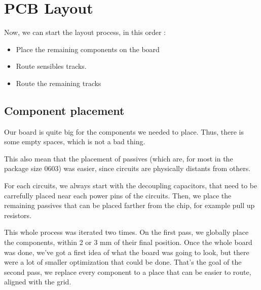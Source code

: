 \section{PCB Layout}
Now, we can start the layout process, in this order :

\begin{itemize}[noitemsep]
    \item   Place the remaining components on the board
    \item   Route sensibles tracks.
    \item   Route the remaining tracks
\end{itemize}

\subsection{Component placement}
Our board is quite big for the components we needed to place. Thus, there is some empty spaces,
which is not a bad thing.

This also mean that the placement of passives (which are, for most in the package size 0603) was
easier, since circuits are physically distants from others.

For each circuits, we always start with the decoupling capacitors, that need to be carrefully
placed near each power pins of the circuits. Then, we place the remaining passives that can
be placed farther from the chip, for example pull up resistors.

This whole process was iterated two times. On the first pass, we globally place the components,
within 2 or 3 mm of their final position. Once the whole board was done, we've got a first idea
of what the board was going to look, but there were a lot of smaller optimization that could be
done. That's the goal of the second pass, we replace every component to a place that can be easier
to route, aligned with the grid.

